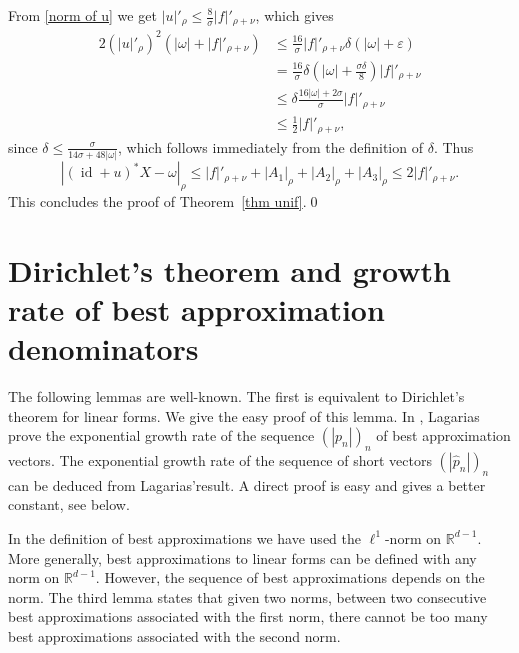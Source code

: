 \documentclass[12pt,reqno,a4paper]{amsart}%
\numberwithin{equation}{section}
\newcommand{\Rr}{{\mathbb{R}}}
\newcommand{\id}  {\operatorname{id}}
\begin{document}
From \eqref{norm of u} we get $|u|'_\rho  \leq \frac{8}{\sigma}|f|'_{\rho+\nu}$, which gives
\begin{align*}
2(|u|'_\rho)^2(|\omega|+|f|'_{\rho+\nu})&\leq  \frac{16}{\sigma}|f|'_{\rho+\nu} \delta (|\omega|+\varepsilon)\\
&=\frac{16}{\sigma} \delta (|\omega|+\frac{\sigma\delta}{8})|f|'_{\rho+\nu}\\
&\leq\delta \frac{16|\omega|+2\sigma}{\sigma}|f|'_{\rho+\nu} \\
&\leq \frac 12|f|'_{\rho+\nu},
\end{align*}
since $\delta\leq \frac{\sigma}{14\sigma+48|\omega|}$,  which follows immediately from the definition of $\delta$.
Thus
$$
|(\id+u)^*X-\omega|_{\rho}\leq |f|'_{\rho+\nu}+|A_1 |_{\rho}+|A_2|_{\rho}+|A_3|_{\rho}\leq 2|f|'_{\rho+\nu}.
$$
This concludes the proof of Theorem~\ref{thm unif}.\qed

\section{Dirichlet's theorem and growth rate of best approximation denominators} \label{appendix C}
	The following lemmas are well-known. The first is equivalent to Dirichlet's theorem for linear forms. We give the easy proof of this lemma.  In \cite{lagarias1983}, Lagarias prove the exponential growth rate of the sequence $(|p_n|)_{n}$ of best approximation vectors. The exponential growth rate of the sequence of short vectors $(|\hat p_n|)_n$ can be deduced from  Lagarias'result. A direct proof is easy and gives a better constant, see below. 
	
	In the definition of best approximations we have used the $\ell^1$-norm on $\Rr^{d-1}$. More generally, best approximations  to linear forms can be defined with any norm on $\Rr^{d-1}$. However, the sequence of best approximations depends on the norm.  The third lemma states that  given two norms, between two consecutive best approximations associated with  the first norm, there cannot be too many best approximations associated with the second norm.
	
\end{document}
